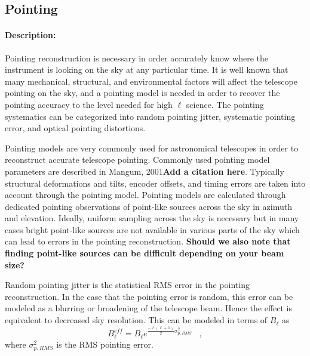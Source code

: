 \subsection{Pointing}

\paragraph{Description:}
Pointing reconstruction is necessary in order accurately know where the instrument is looking on the sky at any particular time. It is well known that many mechanical, structural, and environmental factors will affect the telescope pointing on the sky, and a pointing model is needed in order to recover the pointing accuracy to the level needed for high $\ell$ science. The pointing systematics can be categorized into random pointing jitter, systematic pointing error, and optical pointing distortions.

Pointing models are very commonly used for astronomical telescopes in order to reconstruct accurate telescope pointing. Commonly used pointing model parameters are described in Mangum, 2001\textbf{Add a citation here}. Typically structural deformations and tilts, encoder offsets, and timing errors are taken into account through the pointing model. Pointing models are calculated through dedicated pointing observations of point-like sources across the sky in azimuth and elevation. Ideally, uniform sampling across the sky is necessary but in many cases bright point-like sources are not available in various parts of the sky which can lead to errors in the pointing reconstruction. \textbf{Should we also note that finding point-like sources can be difficult depending on your beam size?}

Random pointing jitter is the statistical RMS error in the pointing reconstruction. In the case that the pointing error is random, this error can be modeled as a blurring or broadening of the telescope beam. Hence the effect is equivalent to decreased sky resolution. This can be modeled in terms of $B_{\ell}$ as
\begin{equation}
B_{\ell}^{eff} = B_{\ell} e^{\frac{-\ell(\ell+1)}{2} \sigma^{2}_{p,RMS}}  \,\,\,\,\, ,
\end{equation}
where $\sigma^{2}_{p,RMS}$ is the RMS pointing error. 

